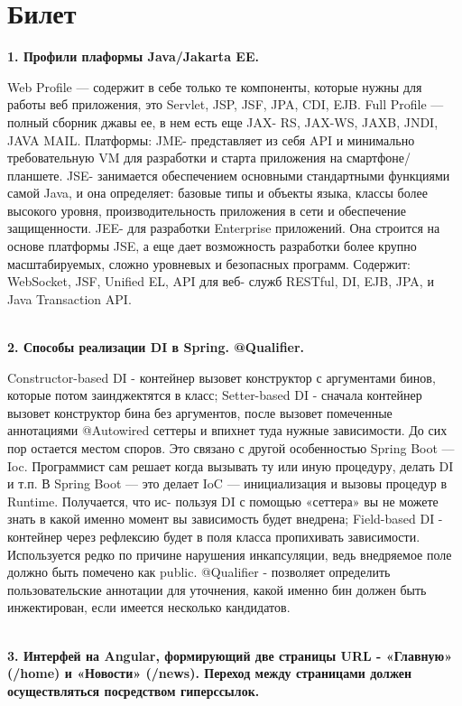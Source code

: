 \documentclass{article}
\newcommand{\bil}[5]{%
        \section{Билет}
        \textbf{1. #1}

        #4
        \\
        \textbf{2. #2}
        
        #5
        \\
        \textbf{3. #3}
}
\begin{document}
\bil{Профили плаформы Java/Jakarta EE.}{Способы реализации DI в Spring. @Qualifier.}
{Интерфей на Angular, формирующий две страницы URL - «Главную» (/home) и «Новости» (/news). Переход между страницами должен осуществляться посредством гиперссылок.}{
    Web Profile — содержит в себе только те компоненты, которые нужны для работы веб приложения, это Servlet, JSP, JSF, JPA, CDI, EJB. Full Profile — полный сборник джавы ее, в нем есть еще JAX- RS, JAX-WS, JAXB, JNDI, JAVA MAIL. 
    Платформы: JME- представляет из себя API и минимально требовательную VM для разработки и старта приложения на смартфоне/планшете. 
    JSE- занимается обеспечением основными стандартными функциями самой Java, и она определяет: базовые типы и объекты языка, классы более высокого уровня, производительность приложения в сети и обеспечение защищенности. 
    JEE- для разработки Enterprise приложений. Она строится на основе платформы JSE, а еще дает возможность разработки более крупно масштабируемых, сложно уровневых и безопасных программ. 
    Содержит: WebSocket, JSF, Unified EL, API для веб- служб RESTful, DI, EJB, JPA, и Java Transaction API.
}{
    Constructor-based DI - контейнер вызовет конструктор с аргументами бинов, которые потом заинджектятся в класс; 
    Setter-based DI - сначала контейнер вызовет конструктор бина без аргументов, после вызовет помеченные аннотациями @Autowired сеттеры и впихнет туда нужные зависимости. 
    До сих пор остается местом споров. 
    Это связано с другой особенностью Spring Boot — Ioc. 
    Программист сам решает когда вызывать ту или иную процедуру, делать DI и т.п. 
    В Spring Boot — это делает IoC — инициализация и вызовы процедур в Runtime. 
    Получается, что ис- пользуя DI с помощью «сеттера» вы не можете знать в какой именно момент вы зависимость будет внедрена; Field-based DI - контейнер через рефлексию будет в поля класса пропихивать зависимости. 
    Используется редко по причине нарушения инкапсуляции, ведь внедряемое поле должно быть помечено как public.
    @Qualifier - позволяет определить пользовательские аннотации для уточнения, какой именно бин должен быть инжектирован, если имеется несколько кандидатов.
}
\end{document}
